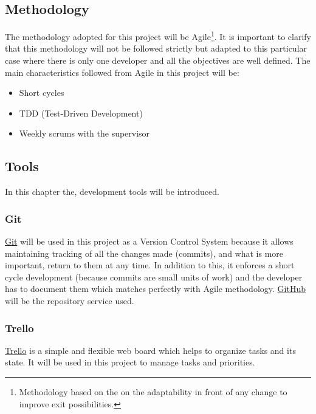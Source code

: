 \subsection{Methodology}
The methodology adopted for this project will be Agile\footnote{Methodology based on the on the adaptability in front of any change to improve exit possibilities.}. It is important to clarify that this methodology will not be followed strictly but adapted to this particular case where there is only one developer and all the objectives are well defined. The main characteristics followed from Agile in this project will be:
\begin{itemize}
	\item Short cycles
	\item TDD (Test-Driven Development)
	\item Weekly scrums with the supervisor
\end{itemize}

\subsection{Tools}
In this chapter the, development tools will be introduced. 
\subsubsection{Git}
\href{https://git-scm.com/}{Git} will be used in this project as a Version Control System because it allows maintaining tracking of all the changes made (commits), and what is more important, return to them at any time. In addition to this, it enforces a short cycle development (because commits are small units of work) and the developer has to document them which matches perfectly with Agile methodology. \href{https://github.com}{GitHub} will be the repository service used.
\subsubsection{Trello}
\href{https://trello.com}{Trello} is a simple and flexible web board which helps to organize tasks and its state. It will be used in this project to manage tasks and priorities.  

